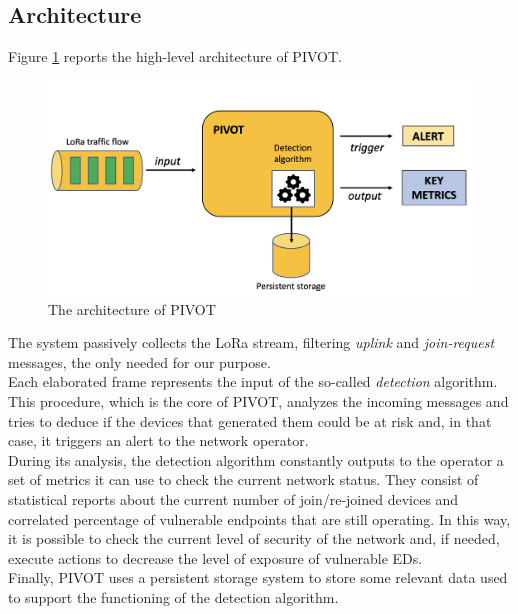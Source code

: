 \subsection{Architecture}
Figure \ref{fig:pivarchitecture} reports the high-level architecture of PIVOT. 
\begin{figure}
    \centering
    \includegraphics[width=0.7\linewidth]{images/pivot/architecture_detail.png}
    \caption{The architecture of PIVOT}
    \vspace{4ex}%
    \label{fig:pivarchitecture}
\end{figure}
The system passively collects the LoRa stream, filtering \textit{uplink} and \textit{join-request} messages, the only needed for our purpose.
\\
Each elaborated frame represents the input of the so-called \textit{detection} algorithm. This procedure, which is the core of PIVOT, analyzes the incoming messages and tries to deduce if the devices that generated them could be at risk and, in that case, it triggers an alert to the network operator.
\\
During its analysis, the detection algorithm constantly outputs to the operator a set of metrics it can use to check the current network status. They consist of statistical reports about the current number of join/re-joined devices and correlated percentage of vulnerable endpoints that are still operating. In this way, it is possible to check the current level of security of the network and, if needed, execute actions to decrease the level of exposure of vulnerable EDs. 
\\
Finally, PIVOT uses a persistent storage system to store some relevant data used to support the functioning of the detection algorithm.

\vspace{5mm}

